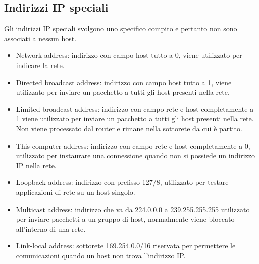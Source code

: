 \subsection{Indirizzi IP speciali}
Gli indirizzi IP speciali svolgono uno specifico compito e pertanto non sono associati a nessun host.
\begin{itemize}
\item Network address: indirizzo con campo host tutto a 0, viene utilizzato per indicare la rete.
\item Directed broadcast address: indirizzo con campo host tutto a 1, viene utilizzato per inviare un pacchetto a tutti gli host presenti nella rete.
\item Limited broadcast address: indirizzo con campo rete e host completamente a 1 viene utilizzato per inviare un pacchetto a tutti gli host presenti nella rete. Non viene processato dal router e rimane nella 
sottorete da cui \`e partito.
\item This computer address: indirizzo con campo rete e host completamente a 0, utilizzato per instaurare una connessione quando non si possiede un indirizzo IP nella rete.
\item Loopback address: indirizzo con prefisso 127/8, utilizzato per testare applicazioni di rete su un host singolo.
\item Multicast address: indirizzo che va da 224.0.0.0 a 239.255.255.255 utilizzato per inviare pacchetti a un gruppo di host, normalmente viene bloccato all'interno di una rete.
\item Link-local address: sottorete 169.254.0.0/16 riservata per permettere le comunicazioni quando un host non trova l'indirizzo IP. 
\end{itemize}
